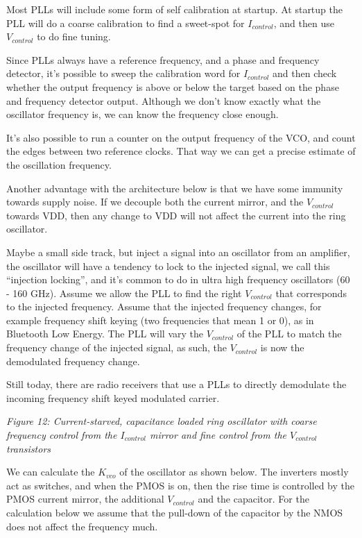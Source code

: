 Most PLLs will include some form of self calibration at startup. At
startup the PLL will do a coarse calibration to find a sweet-spot for
\(I_{control}\), and then use \(V_{control}\) to do fine tuning.

Since PLLs always have a reference frequency, and a phase and frequency
detector, it's possible to sweep the calibration word for
\(I_{control}\) and then check whether the output frequency is above or
below the target based on the phase and frequency detector output.
Although we don't know exactly what the oscillator frequency is, we can
know the frequency close enough.

It's also possible to run a counter on the output frequency of the VCO,
and count the edges between two reference clocks. That way we can get a
precise estimate of the oscillation frequency.

Another advantage with the architecture below is that we have some
immunity towards supply noise. If we decouple both the current mirror,
and the \(V_{control}\) towards VDD, then any change to VDD will not
affect the current into the ring oscillator.

Maybe a small side track, but inject a signal into an oscillator from an
amplifier, the oscillator will have a tendency to lock to the injected
signal, we call this ``injection locking'', and it's common to do in
ultra high frequency oscillators (60 - 160 GHz). Assume we allow the PLL
to find the right \(V_{control}\) that corresponds to the injected
frequency. Assume that the injected frequency changes, for example
frequency shift keying (two frequencies that mean 1 or 0), as in
Bluetooth Low Energy. The PLL will vary the \(V_{control}\) of the PLL
to match the frequency change of the injected signal, as such, the
\(V_{control}\) is now the demodulated frequency change.

Still today, there are radio receivers that use a PLLs to directly
demodulate the incoming frequency shift keyed modulated carrier.


{
\centering
{}
}

\emph{Figure 12: Current-starved, capacitance loaded ring oscillator
with coarse frequency control from the \(I_{control}\) mirror and fine
control from the \(V_{control}\) transistors}

We can calculate the \(K_{vco}\) of the oscillator as shown below. The
inverters mostly act as switches, and when the PMOS is on, then the rise
time is controlled by the PMOS current mirror, the additional
\(V_{control}\) and the capacitor. For the calculation below we assume
that the pull-down of the capacitor by the NMOS does not affect the
frequency much.

